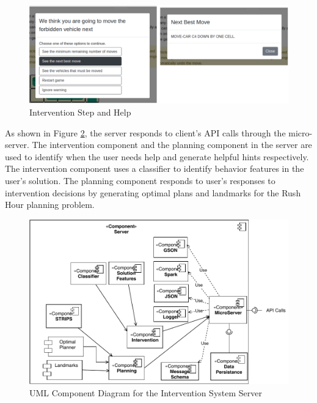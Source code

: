 \documentclass[doctor]{thesis} %
\theoremstyle{plain}
\begin{document}
\begin{figure}[!hbt]
  \centering
\includegraphics[width=\columnwidth]{img/alert.pdf}
  \caption{Intervention Step and Help}
  \label{fig:help}
\end{figure}
As shown in Figure \ref{fig:compserver}, the server responds to client's API calls through the micro-server. The intervention component and the planning component in the server are used to identify when the user needs help and generate helpful hints respectively. The intervention component uses a classifier to identify behavior features in the user's solution. The planning component responds to user's responses to intervention decisions by generating optimal plans and landmarks for the Rush Hour planning problem.

\begin{figure}[!hbt]
  \centering
\includegraphics[width=\columnwidth]{img/componentserver.pdf}
  \caption{UML Component Diagram for the Intervention System Server}
  \label{fig:compserver}
\end{figure}
\end{document}
